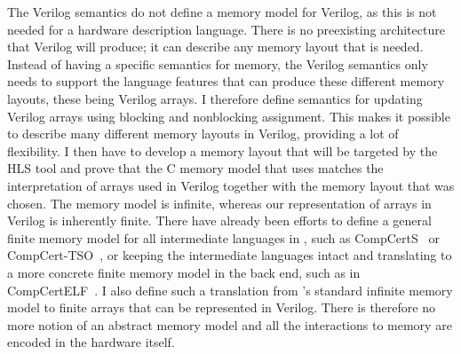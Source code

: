 The Verilog semantics do not define a memory model for Verilog, as this is not
needed for a hardware description language.  There is no preexisting
architecture that Verilog will produce; it can describe any memory layout that
is needed.  Instead of having a specific semantics for memory, the Verilog
semantics only needs to support the language features that can produce these
different memory layouts, these being Verilog arrays.  I therefore define
semantics for updating Verilog arrays using blocking and nonblocking assignment.
This makes it possible to describe many different memory layouts in Verilog,
providing a lot of flexibility.  I then have to develop a memory layout that
will be targeted by the \gls{HLS} tool and prove that the C memory model that
\compcert{} uses matches the interpretation of arrays used in Verilog together
with the memory layout that was chosen.  The \compcert{} memory model is
infinite, whereas our representation of arrays in Verilog is inherently finite.
There have already been efforts to define a general finite memory model for all
intermediate languages in \compcert{}, such as CompCertS~\cite{besson18_compc}
or CompCert-TSO~\cite{sevcik13_compc}, or keeping the intermediate languages
intact and translating to a more concrete finite memory model in the back end,
such as in Comp\-Cert\-ELF~\cite{wang20_compc}.  I also define such a
translation from \compcert{}'s standard infinite memory model to finite arrays
that can be represented in Verilog.  There is therefore no more notion of an
abstract memory model and all the interactions to memory are encoded in the
hardware itself.

